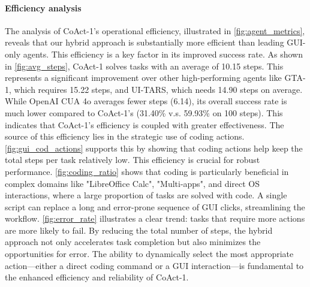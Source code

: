 \documentclass{article} %
\newcommand{\ours}{CoAct-1\xspace}
\begin{document}
\paragraph{Efficiency analysis}
The analysis of \ours's operational efficiency, illustrated in \autoref{fig:agent_metrics}, reveals that our hybrid approach is substantially more efficient than leading GUI-only agents. This efficiency is a key factor in its improved success rate. As shown in \autoref{fig:avg_steps}, \ours solves tasks with an average of 10.15 steps. This represents a significant improvement over other high-performing agents like GTA-1, which requires 15.22 steps, and UI-TARS, which needs 14.90 steps on average. While OpenAI CUA 4o averages fewer steps (6.14), its overall success rate is much lower compared to \ours's (31.40\% v.s. 59.93\% on 100 steps). This indicates that \ours's efficiency is coupled with greater effectiveness. The source of this efficiency lies in the strategic use of coding actions. \autoref{fig:gui_cod_actions} supports this by showing that coding actions help keep the total steps per task relatively low. This efficiency is crucial for robust performance. \autoref{fig:coding_ratio} shows that coding is particularly beneficial in complex domains like "LibreOffice Calc", "Multi-apps", and direct OS interactions, where a large proportion of tasks are solved with code. A single script can replace a long and error-prone sequence of GUI clicks, streamlining the workflow.  \autoref{fig:error_rate} illustrates a clear trend: tasks that require more actions are more likely to fail. By reducing the total number of steps, the hybrid approach not only accelerates task completion but also minimizes the opportunities for error. The ability to dynamically select the most appropriate action—either a direct coding command or a GUI interaction—is fundamental to the enhanced efficiency and reliability of \ours. 
\end{document}
